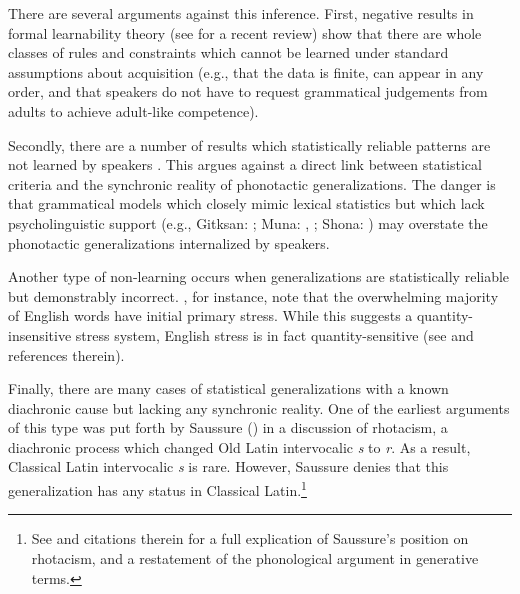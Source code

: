 There are several arguments against this inference. First, negative results in formal learnability theory (see \citealt{Yang2012} for a recent review) show that there are whole classes of rules and constraints which cannot be learned under standard assumptions about acquisition (e.g., that the data is finite, can appear in any order, and that speakers do not have to request grammatical judgements from adults to achieve adult-like competence). 

Secondly, there are a number of results which statistically reliable patterns are not learned by speakers \citep[e.g.,][]{Becker2011,Hayes2006,Hayes2009,HayesInPress}. This argues against a direct link between statistical criteria and the synchronic reality of phonotactic generalizations. The danger is that grammatical models which closely mimic lexical statistics but which lack psycholinguistic support (e.g., Gitksan: \citealt{Brown2010}; Muna: \citealt{Anttila2008a}, \citealt{Coetzee2008a}; Shona: \citealt[][385]{Hayes2008a}) may overstate the phonotactic generalizations internalized by speakers. 

Another type of non-learning occurs when generalizations are statistically reliable but demonstrably incorrect. \citet{Legate2012}, for instance, note that the overwhelming majority of English words have initial primary stress. While this suggests a quantity-insensitive stress system, English stress is in fact quantity-sensitive (see \citealt{Halle1998c} and references therein). 

Finally, there are many cases of statistical generalizations with a known diachronic cause but lacking any synchronic reality. One of the earliest arguments of this type was put forth by Saussure (\citeyear[202f.]{CLG}) in a discussion of rhotacism, a diachronic process which changed Old Latin intervocalic \emph{s} to \emph{r}. As a result, Classical Latin intervocalic \emph{s} is rare. However, Saussure denies that this generalization has any status in Classical Latin.\footnote{See \citet{Gorman2012e} and citations therein for a full explication of Saussure's position on rhotacism, and a restatement of the phonological argument in generative terms.} 

